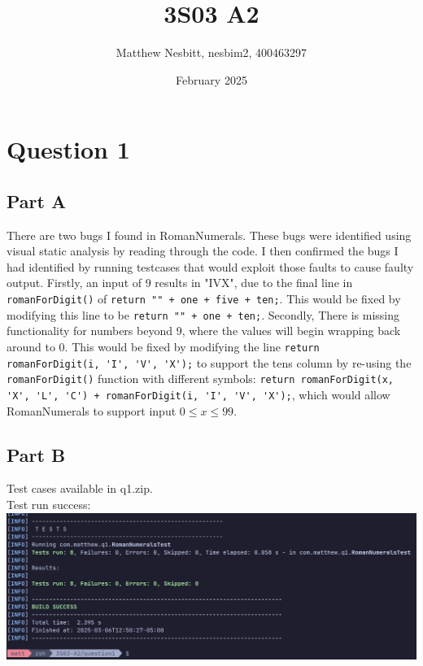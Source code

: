 \documentclass{article}
\title{3S03 A2}
\author{Matthew Nesbitt, nesbim2, 400463297}
\date{February 2025}
\begin{document}
\maketitle
\section{Question 1}
\subsection{Part A}
There are two bugs I found in RomanNumerals. These bugs were identified using visual static analysis by reading through the code. I then
confirmed the bugs I had identified by running testcases that would exploit those faults to cause faulty output.
Firstly, an input of 9 results in "IVX", due to the final line in \lstinline{romanForDigit()} of
\lstinline{return "" + one + five + ten;}. This would be fixed by modifying this line to be \lstinline{return "" + one + ten;}. Secondly, There
is missing functionality for numbers beyond 9, where the values will begin wrapping back around to 0. This would be fixed by modifying the
line \lstinline{return romanForDigit(i, 'I', 'V', 'X');} to support the tens column by re-using the \lstinline{romanForDigit()} function
with different symbols: \lstinline{return romanForDigit(x, 'X', 'L', 'C') + romanForDigit(i, 'I', 'V', 'X');},
which would allow RomanNumerals to support input $0 \leq x \leq 99$.
\subsection{Part B}
Test cases available in q1.zip.\\
Test run success:\medskip \\
\includegraphics[scale=0.3]{tests.png}
\end{document}
